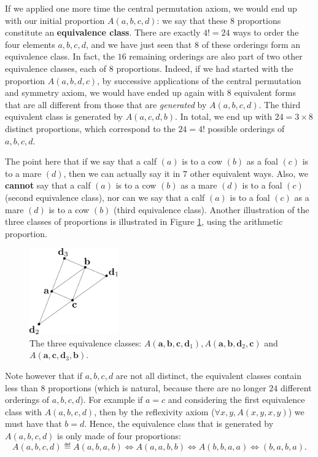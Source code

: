 If we applied one more time the central permutation axiom, we would end up with
our initial proportion $A(a,b,c,d)$: we say that these $8$ proportions
constitute an \textbf{equivalence class}. There are exactly $4! = 24$ ways to
order the four elements $a, b, c, d$, and we have just seen that $8$ of these
orderings form an equivalence class. In fact, the $16$ remaining orderings are
also part of two other equivalence classes, each of $8$ proportions. Indeed, if we had
started with the proportion $A(a,b,d,c)$, by successive applications of the
central permutation and symmetry axiom, we would have ended up again with $8$
equivalent forms that are all different from those that are \textit{generated}
by $A(a, b, c, d)$. The third equivalent class is generated by $A(a, c, d, b)$.
In total, we end up with $24 = 3 \times 8$ distinct proportions, which
correspond to the $24 = 4!$ possible orderings of $a, b, c, d$.

\begin{testexample}
  The point here that if we say that a calf $(a)$ is to a cow $(b)$ as a foal
  $(c)$ is to a mare $(d)$, then we can actually say it in $7$ other equivalent
  ways. Also, we \textbf{cannot} say that a calf $(a)$ is to a cow $(b)$ as a mare $(d)$
  is to a foal $(c)$ (second equivalence class), nor can we say that a calf
  $(a)$ is to a foal $(c)$ as a  mare $(d)$  is to a cow $(b)$ (third
  equivalence class).  Another illustration of the three classes of proportions
  is illustrated in Figure \ref{FIG:3_classes}, using the arithmetic
  proportion.
\end{testexample}

\begin{figure}[!h]
\centering
  \includegraphics[width=1.5in]{figures/three_classes.pdf}
  \caption{The three equivalence classes: $A(\mathbf{a}, \mathbf{b},
  \mathbf{c}, \mathbf{d}_1), A(\mathbf{a}, \mathbf{b}, \mathbf{d}_2,
  \mathbf{c})$ and $A(\mathbf{a}, \mathbf{c}, \mathbf{d}_3,\mathbf{b})$.}
\label{FIG:3_classes}
\end{figure}

Note however that if $a, b, c, d$ are not all distinct, the equivalent classes
contain less than $8$ proportions (which is natural, because there are no
longer $24$ different orderings of $a, b, c, d$). For example if $a = c$ and
considering the first equivalence class with $A(a, b, c, d)$, then
by the reflexivity axiom ($\forall x, y, A(x, y, x, y)$) we must have that $b =
d$. Hence, the equivalence class that is generated by $A(a, b, c, d)$ is only
made of four proportions:
$$A(a, b, c, d) \eqdef A(a, b, a, b) \iff A(a, a, b, b) \iff A(b, b, a, a) \iff
(b, a, b, a).$$

